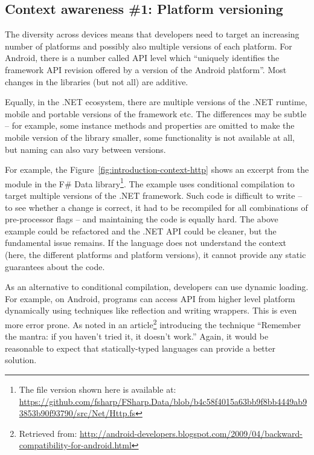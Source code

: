 
\subsection{Context awareness \#1: Platform versioning}

The diversity across devices means that developers need to target an increasing number of platforms
and possibly also multiple versions of each platform. For Android, there is a number called
API level \cite{app-android-apilevel} which ``uniquely identifies the framework API revision offered
by a version of the Android platform''. Most changes in the libraries (but not all) are additive.

Equally, in the .NET ecosystem, there are multiple versions of the .NET runtime, mobile and
portable versions of the framework etc. The differences may be subtle -- for example, some instance
methods and properties are omitted to make the mobile version of the library smaller, some functionality 
is not available at all, but naming can also vary between versions.

For example, the Figure~\ref{fig:introduction-context-http} shows an excerpt from the  module
in the F\# Data library\footnote{The file version shown here is available at:
\url{https://github.com/fsharp/FSharp.Data/blob/b4c58f4015a63bb9f8bb4449ab93853b90f93790/src/Net/Http.fs}}.
The example uses conditional compilation to target multiple versions of the .NET framework. Such code
is difficult to write -- to see whether a change is correct, it had to be recompiled for all combinations
of pre-processor flags -- and maintaining the code is equally hard. The above example could be refactored
and the .NET API could be cleaner, but the fundamental issue remains. If the language does not understand
the context (here, the different platforms and platform versions), it cannot provide any static
guarantees about the code.

As an alternative to conditional compilation, developers can use dynamic loading. For example,
on Android, programs can access API from higher level platform dynamically using techniques like
reflection and writing wrappers. This is even more error prone. As noted in an article\footnote{Retrieved 
from: \url{http://android-developers.blogspot.com/2009/04/backward-}\\\url{compatibility-for-android.html}}
introducing the technique ``Remember the mantra: if you haven't tried it, it doesn't work.'' 
Again, it would be reasonable to expect that statically-typed languages can provide a better solution.

